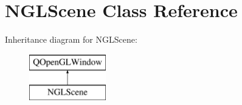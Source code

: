 \hypertarget{class_n_g_l_scene}{\section{N\-G\-L\-Scene Class Reference}
\label{class_n_g_l_scene}
}
Inheritance diagram for N\-G\-L\-Scene\-:\begin{figure}[H]
\begin{center}
\leavevmode
\includegraphics[height=2.000000cm]{class_n_g_l_scene}
\end{center}
\end{figure}
